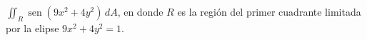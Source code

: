 \item $\iint_R \operatorname{sen}(9x^2 + 4y^2) \, dA$, en donde $R$ es la región del primer cuadrante limitada por la elipse $9x^2 + 4y^2 = 1$.

